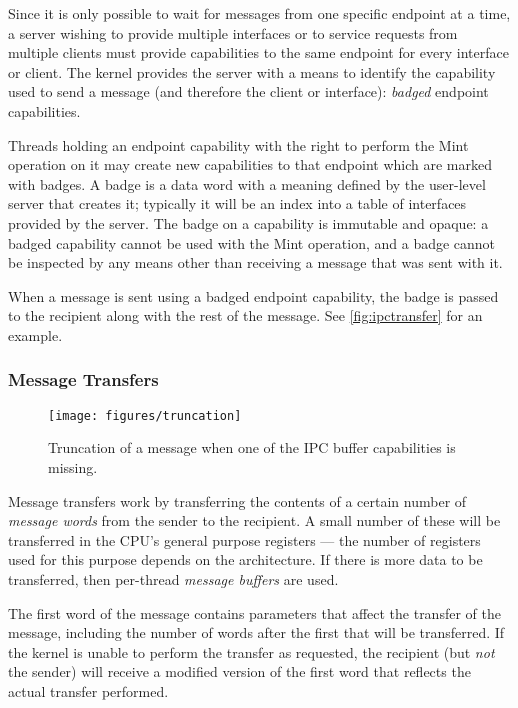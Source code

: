 Since it is only possible to wait for messages from one specific endpoint at a
time, a server wishing to provide multiple interfaces or to service requests
from multiple clients must provide capabilities to the same endpoint for every
interface or client. The kernel provides the server with a means to identify
the capability used to send a message (and therefore the client or interface):
\emph{badged} endpoint capabilities.

Threads holding an endpoint capability with the right to perform the
Mint operation on it may create new capabilities to that endpoint which
are marked with badges. A badge is a data word with a meaning defined by
the user-level server that creates it; typically it will be an index into a
table of interfaces provided by the server. The badge on a capability is
immutable and opaque: a badged capability cannot be used with the Mint operation, and a badge cannot be inspected by any means other than receiving a message that was sent with it.

When a message is sent using a badged endpoint capability, the badge is passed
to the recipient along with the rest of the message. See
\autoref{fig:ipctransfer} for an example.

\subsubsection{Message Transfers}

\begin{figure}
\centering \texttt{[image: figures/truncation]}
\caption{Truncation of a message when one of the IPC buffer capabilities is
missing.}
\label{fig:truncation}
\end{figure}

Message transfers work by transferring the contents of a certain number of
\emph{message words} from the sender to the recipient. A small number of
these will be transferred in the CPU's general purpose registers --- the number
of registers used for this purpose depends on the architecture. If there is
more data to be transferred, then per-thread \emph{message buffers} are used.

The first word of the message contains parameters that affect the transfer of
the message, including the number of words after the first that will be
transferred. If the kernel is unable to perform the transfer as requested, the
recipient (but \emph{not} the sender) will receive a modified version of the
first word that reflects the actual transfer performed.

